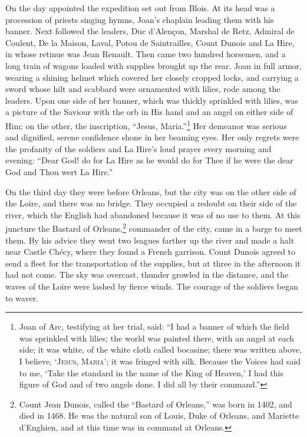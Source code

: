 On the day appointed the expedition set out from Blois. At its head was
a procession of priests singing hymns, Joan's chaplain leading them with
his banner. Next followed the leaders, Duc d'Alençon, Marshal de Retz,
Admiral de Coulent, De la Maison, Laval, Potou de Saintrailles, Count
Dunois and La Hire, in whose retinue was Jean Renault. Then came two
hundred horsemen, and a long train of wagons loaded with supplies
brought up the rear. Joan in full armor, wearing a shining helmet which
covered her closely cropped locks, and carrying a sword whose hilt and
scabbard were ornamented with lilies, rode among the leaders. Upon one
side of her banner, which was thickly sprinkled with lilies, was a
picture of the Saviour with the orb in His hand and an angel on either
side of Him; on the other, the inscription, ``Jesus, Maria.''\footnote{Joan
  of Arc, testifying at her trial, said: ``I had a banner of which the
  field was sprinkled with lilies; the world was painted there, with an
  angel at each side; it was white, of the white cloth called bocasine;
  there was written above, I believe, `\textsc{Jesus, Maria}'; it was
  fringed with silk. Because the Voices had said to me, `Take the
  standard in the name of the King of Heaven,' I had this figure of God
  and of two angels done. I did all by their command.''} Her demeanor
was serious and dignified, serene confidence shone in her beaming eyes.
Her only regrets were the profanity of the soldiers and La Hire's loud
prayer every morning and evening: ``Dear God! do for La Hire as he would
do for Thee if he were the dear God and Thou wert La Hire.''

On the third day they were before Orleans, but the city was on the other
side of the Loire, and there was no bridge. They occupied a redoubt on
their side of the river, which the English had abandoned because it was
of no use to them. At this juncture the Bastard of Orleans,\footnote{Count
  Jean Dunois, called the ``Bastard of Orleans,'' was born in 1402, and
  died in 1468. He was the natural son of Louis, Duke of Orleans, and
  Mariette d'Enghien, and at this time was in command at Orleans.}
commander of the city, came in a barge to meet them. By his advice they
went two leagues farther up the river and made a halt near Castle Chécy,
where they found a French garrison. Count Dunois agreed to send a fleet
for the transportation of the supplies, but at three in the afternoon it
had not come. The sky was overcast, thunder growled in the distance, and
the waves of the Loire were lashed by fierce winds. The courage of the
soldiers began to waver.

